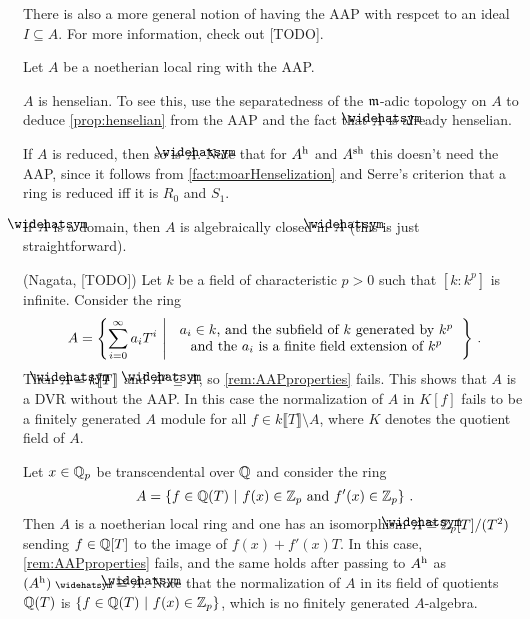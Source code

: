 \documentclass[a4paper, 10pt, oneside, DIV=9, chapterprefix=true, numbers=enddot, bibliography=totoc]{scrbook}
\begin{document}
There is also a more general notion of having the AAP with respcet to an ideal $I\subseteq A$. For more information, check out [TODO].
\begin{rem}\label{rem:AAPproperties}
	Let $A$ be a noetherian local ring with the AAP.
	\begin{alphanumerate}
		\item $A$ is henselian. To see this, use the separatedness of the $\mathfrak{m}$-adic topology on $A$ to deduce \cref{prop:henselian} from the AAP and the fact that $\roof{A}$ is already henselian.
		\item If $A$ is reduced, then so is $\roof{A}$. Note that for $A^{\mathrm{h}}$ and $A^{\mathrm{sh}}$ this doesn't need the AAP, since it follows from \cref{fact:moarHenselization} and Serre's criterion that a ring is reduced iff it is $R_0$ and $S_1$.
		\item If $\roof{A}$ is a domain, then $A$ is algebraically closed in $\roof{A}$ (this is just straightforward).
	\end{alphanumerate}
\end{rem}
\begin{exm}
	\begin{alphanumerate}
		\item (Nagata, [TODO]) Let $k$ be a field of characteristic $p>0$ such that $[k:k^p]$ is infinite. Consider the ring
		\begin{equation*}
			A=\left\{\sum_{i=0}^\infty a_iT^i\st
			\begin{tabular}{c}
				$a_i\in k$, and the subfield of $k$ generated by $k^p$\\
				and the $a_i$ is a finite field extension of $k^p$
			\end{tabular}\right\}\,.
		\end{equation*}
		Then $\roof{A}=k\llbracket T\rrbracket$ and $\roof{A}^p\subseteq A$, so \cref{rem:AAPproperties} fails. This shows that $A$ is a DVR without the AAP. In this case the normalization of $A$ in $K[f]$ fails to be a finitely generated $A$ module for all $f\in k\llbracket T\rrbracket\setminus A$, where $K$ denotes the quotient field of $A$.
		\item Let $x\in \mathbb{Q}_p$ be transcendental over $\mathbb{Q}$ and consider the ring
		\begin{equation*}
			A=\left\{f\in\mathbb{Q}(T)\ \middle|\  f(x)\in\mathbb{Z}_p\text{ and }f'(x)\in\mathbb{Z}_p\right\}\,.
		\end{equation*}
		Then $A$ is a noetherian local ring and one has an isomorphism $\roof{A}\cong \IZ_p[T]/(T^2)$ sending $f\in \mathbb{Q}[T]$ to the image of $f(x)+f'(x)T$. In this case, \cref{rem:AAPproperties} fails, and the same holds after passing to $A^{\mathrm{h}}$ as $(A^\h)^\complete\cong \roof{A}$. Note that the normalization of $A$ in its field of quotients $\mathbb{Q}(T)$ is $\left\{f\in\mathbb{Q}(T)\ \middle|\  f(x)\in\mathbb{Z}_p\right\}$, which is no finitely generated $A$-algebra.
	\end{alphanumerate}
\end{exm}
\end{document}
